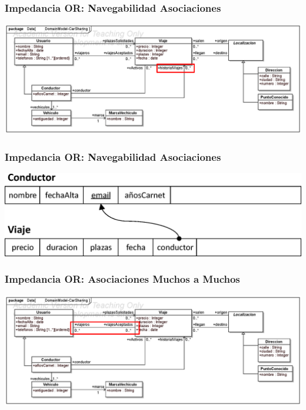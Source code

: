 \documentclass[a4paper,slidestop,xcolor=pst,blue]{beamer}
\begin{document}
\begin{frame}[c]
    \frametitle{Impedancia OR: Navegabilidad Asociaciones}
    \begin{center}
        \includegraphics[width=\linewidth]{images/ooMismatch/ooMismatch05.eps}
    \end{center}
\end{frame}

\begin{frame}[c]
    \frametitle{Impedancia OR: Navegabilidad Asociaciones}
    \begin{center}
        \includegraphics[width=0.8\linewidth]{images/ooMismatch/ooMismatch06.eps}
    \end{center}
\end{frame}

\begin{frame}[c]
    \frametitle{Impedancia OR: Asociaciones Muchos a Muchos}
    \begin{center}
        \includegraphics[width=\linewidth]{images/ooMismatch/ooMismatch07.eps}
    \end{center}
\end{frame}
\end{document}
